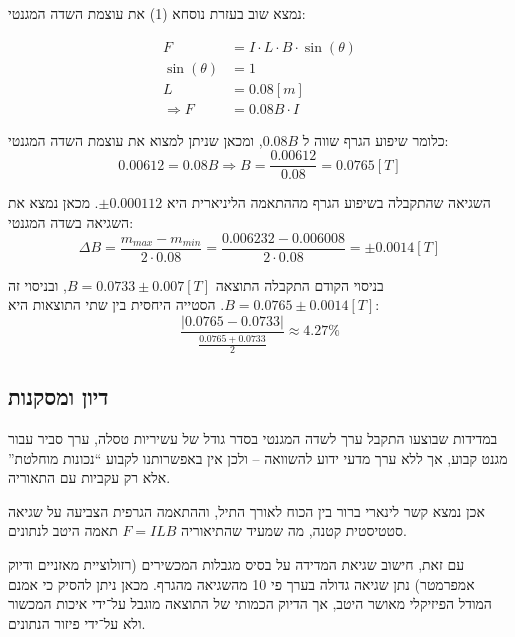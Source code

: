 \documentclass[14pt]{extarticle}
\begin{document}
נמצא שוב בעזרת נוסחא (1) את עוצמת השדה המגנטי:
\begin{center}
    \begin{equation*}
        \begin{aligned}
            F             & = I \cdot L \cdot B \cdot \sin(\theta) \\
            \sin(\theta)  & = 1                                    \\
            L             & = 0.08 [m]                             \\
            \Rightarrow F & = 0.08B \cdot I
        \end{aligned}
    \end{equation*}
\end{center}

כלומר שיפוע הגרף שווה ל $0.08B$, ומכאן שניתן למצוא את עוצמת השדה המגנטי:
\begin{equation*}
    0.00612 = 0.08B \Rightarrow B = \frac{0.00612}{0.08} = 0.0765 [T]
\end{equation*}

השגיאה שהתקבלה בשיפוע הגרף מההתאמה הליניארית היא $\pm 0.000112$. מכאן נמצא את השגיאה בשדה המגנטי:
\begin{equation*}
    \Delta B  = \frac{m_{max} - m_{min}}{2 \cdot 0.08} = \frac{0.006232 - 0.006008}{2 \cdot 0.08} = \pm 0.0014 [T]
\end{equation*}

בניסוי הקודם התקבלה התוצאה $B=0.0733 \pm 0.007 [T]$, ובניסוי זה $B=0.0765 \pm 0.0014 [T]$.
הסטייה היחסית בין שתי התוצאות היא:
\begin{equation*}
    \frac{|0.0765 - 0.0733|}{\frac{0.0765 + 0.0733}{2}} \approx 4.27 \%
\end{equation*}

\subsection*{דיון ומסקנות}
במדידות שבוצעו התקבל ערך לשדה המגנטי בסדר גודל של עשיריות טסלה, ערך סביר עבור מגנט קבוע, אך ללא ערך מדעי ידוע להשוואה – ולכן אין באפשרותנו לקבוע “נכונות מוחלטת” אלא רק עקביות עם התאוריה.

אכן נמצא קשר לינארי ברור בין הכוח לאורך התיל, וההתאמה הגרפית הצביעה על שגיאה סטטיסטית קטנה, מה שמעיד שהתיאוריה $F=ILB$ תאמה היטב לנתונים.


עם זאת, חישוב שגיאת המדידה על בסיס מגבלות המכשירים (רזולוציית מאזניים ודיוק אמפרמטר) נתן שגיאה גדולה בערך פי 10 מהשגיאה מהגרף. מכאן ניתן להסיק כי אמנם המודל הפיזיקלי מאושר היטב, אך הדיוק הכמותי של התוצאה מוגבל על־ידי איכות המכשור ולא על־ידי פיזור הנתונים.
\end{document}
